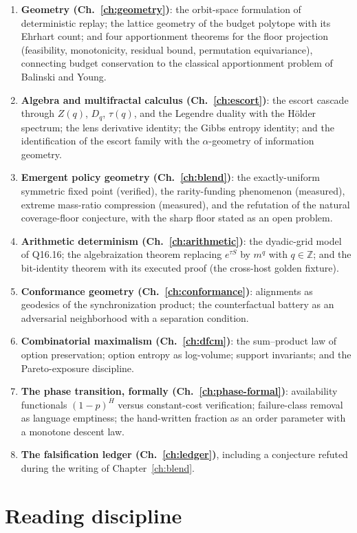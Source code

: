 \documentclass[12pt,oneside]{report}
\theoremstyle{plain}
\theoremstyle{definition}
\theoremstyle{remark}
\newcommand{\Z}{\mathbb{Z}}
\begin{document}
\begin{enumerate}
\item \textbf{Geometry (Ch.~\ref{ch:geometry})}: the orbit-space
formulation of deterministic replay; the lattice geometry of the budget
polytope with its Ehrhart count; and four apportionment theorems for
the floor projection (feasibility, monotonicity, residual bound,
permutation equivariance), connecting budget conservation to the
classical apportionment problem of Balinski and Young.
\item \textbf{Algebra and multifractal calculus
(Ch.~\ref{ch:escort})}: the escort cascade through $Z(q)$, $D_q$,
$\tau(q)$, and the Legendre duality with the H\"older spectrum; the
lens derivative identity; the Gibbs entropy identity; and the
identification of the escort family with the $\alpha$-geometry of
information geometry.
\item \textbf{Emergent policy geometry (Ch.~\ref{ch:blend})}: the
exactly-uniform symmetric fixed point (verified), the rarity-funding
phenomenon (measured), extreme mass-ratio compression (measured), and
the refutation of the natural coverage-floor conjecture, with the sharp
floor stated as an open problem.
\item \textbf{Arithmetic determinism (Ch.~\ref{ch:arithmetic})}: the
dyadic-grid model of Q16.16; the algebraization theorem replacing
$e^{\tau S}$ by $m^q$ with $q \in \Z$; and the bit-identity theorem
with its executed proof (the cross-host golden fixture).
\item \textbf{Conformance geometry (Ch.~\ref{ch:conformance})}:
alignments as geodesics of the synchronization product; the
counterfactual battery as an adversarial neighborhood with a separation
condition.
\item \textbf{Combinatorial maximalism (Ch.~\ref{ch:dfcm})}: the
sum--product law of option preservation; option entropy as log-volume;
support invariants; and the Pareto-exposure discipline.
\item \textbf{The phase transition, formally
(Ch.~\ref{ch:phase-formal})}: availability functionals
$(1-p)^H$ versus constant-cost verification; failure-class removal as
language emptiness; the hand-written fraction as an order parameter
with a monotone descent law.
\item \textbf{The falsification ledger (Ch.~\ref{ch:ledger})},
including a conjecture refuted during the writing of
Chapter~\ref{ch:blend}.
\end{enumerate}

\section{Reading discipline}
\end{document}
